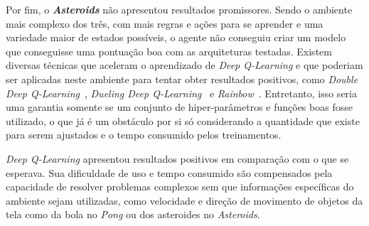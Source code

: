 Por fim, o \textbf{\textit{Asteroids}} não apresentou resultados promissores.
Sendo o ambiente mais complexo dos três, com mais regras e ações para se aprender e uma variedade maior de estados possíveis, o agente não conseguiu criar um modelo que conseguisse uma pontuação boa com as arquiteturas testadas.
Existem diversas técnicas que aceleram o aprendizado de \textit{Deep Q-Learning} e que poderiam ser aplicadas neste ambiente para tentar obter resultados positivos, como \textit{Double Deep Q-Learning}~\cite{DBLP:journals/corr/HasseltGS15}, \textit{Dueling Deep Q-Learning}~\cite{DBLP:journals/corr/WangFL15} e \textit{Rainbow}~\cite{DBLP:journals/corr/abs-1710-02298}.
Entretanto, isso seria uma garantia somente se um conjunto de hiper-parâmetros e funções boas fosse utilizado, o que já é um obstáculo por si só considerando a quantidade que existe para serem ajustados e o tempo consumido pelos treinamentos.

\textit{Deep Q-Learning} apresentou resultados positivos em comparação com o que se esperava.
Sua dificuldade de uso e tempo consumido são compensados pela capacidade de resolver problemas complexos sem que informações específicas do ambiente sejam utilizadas, como velocidade e direção de movimento de objetos da tela como da bola no \textit{Pong} ou dos asteroides no \textit{Asteroids}.


%



